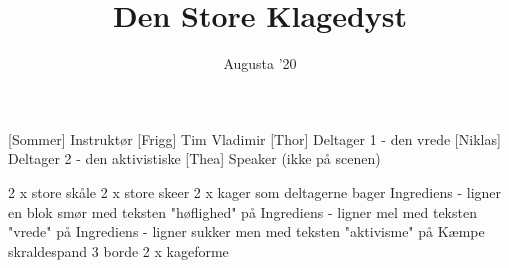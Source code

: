 \documentclass[a4paper,11pt]{article}
\title{Den Store Klagedyst}
\author{Augusta '20}
\begin{document}
\maketitle

\begin{roles}
[Sommer] Instruktør
[Frigg] Tim Vladimir
[Thor] Deltager 1 - den vrede
[Niklas] Deltager 2 - den aktivistiske
[Thea] Speaker (ikke på scenen)
\end{roles}

\begin{props}
     2 x store skåle 
     2 x store skeer
     2 x kager som deltagerne bager 
     Ingrediens - ligner en blok smør med teksten "høflighed" på
     Ingrediens - ligner mel med teksten "vrede" på
     Ingrediens - ligner sukker men med teksten "aktivisme" på
     Kæmpe skraldespand
     3 borde
     2 x kageforme
\end{props}
\end{document}
